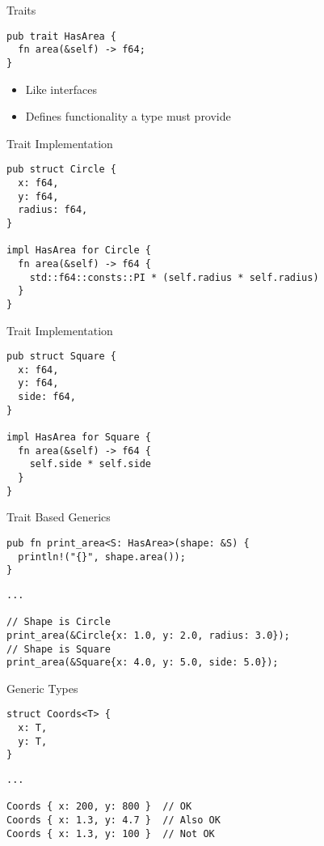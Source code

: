 \begin{frame}[fragile]{Traits}
\begin{verbatim}
pub trait HasArea {
  fn area(&self) -> f64;
}
\end{verbatim}
\begin{itemize}
	\item Like interfaces
	\item Defines functionality a type must provide
\end{itemize}
\end{frame}


\begin{frame}[fragile]{Trait Implementation}
\begin{verbatim}
pub struct Circle {
  x: f64,
  y: f64,
  radius: f64,
}

impl HasArea for Circle {
  fn area(&self) -> f64 {
    std::f64::consts::PI * (self.radius * self.radius)
  }
}
\end{verbatim}
\end{frame}

\begin{frame}[fragile]{Trait Implementation}
\begin{verbatim}
pub struct Square {
  x: f64,
  y: f64,
  side: f64,
}

impl HasArea for Square {
  fn area(&self) -> f64 {
    self.side * self.side
  }
}
\end{verbatim}
\end{frame}


\begin{frame}[fragile]{Trait Based Generics}

\begin{verbatim}
pub fn print_area<S: HasArea>(shape: &S) {
  println!("{}", shape.area());
}
\end{verbatim}
\pause
\begin{verbatim}
...

// Shape is Circle
print_area(&Circle{x: 1.0, y: 2.0, radius: 3.0});
// Shape is Square
print_area(&Square{x: 4.0, y: 5.0, side: 5.0});
\end{verbatim}

\end{frame}


\begin{frame}[fragile]{Generic Types}
\begin{verbatim}
struct Coords<T> {
  x: T,
  y: T,
}
\end{verbatim}
\pause
\begin{verbatim}
...

Coords { x: 200, y: 800 }  // OK
Coords { x: 1.3, y: 4.7 }  // Also OK
Coords { x: 1.3, y: 100 }  // Not OK
\end{verbatim}
\end{frame}

